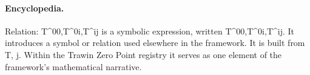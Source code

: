 \paragraph{Encyclopedia.}
Relation: T\textasciicircum{}00,T\textasciicircum{}0i,T\textasciicircum{}ij is a symbolic expression, written T\textasciicircum{}00,T\textasciicircum{}0i,T\textasciicircum{}ij. It introduces a symbol or relation used elsewhere in the framework. It is built from T, j. Within the Trawin Zero Point registry it serves as one element of the framework's mathematical narrative.
